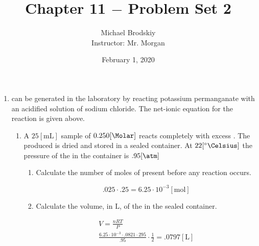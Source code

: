 \documentclass[12pt]{article}
\title{Chapter 11 $-$ Problem Set 2}
\date{February 1, 2020}
\author{Michael Brodskiy\\ \small Instructor: Mr. Morgan}
\begin{document}
\maketitle

\begin{center}
\end{center}

\begin{enumerate}

  \item {} can be generated in the laboratory by reacting potassium permanganate with an acidified solution of sodium chloride. The net-ionic equation for the reaction is given above.

    \begin{enumerate}

      \item A $25[\si{\milli\liter}]$ sample of $0.250[\si{\Molar}]$  reacts completely with excess . The  produced is dried and stored in a sealed container. At $22[\si{\degree\Celsius}]$ the pressure of the  in the container is $.95[\si{\atm}]$

        \begin{enumerate}

          \item Calculate the number of moles of  present before any reaction occurs.

            \begin{equation}
              .025\cdot.25=6.25\cdot10^{-3}[\si{\mole}]
              \label{1}
            \end{equation}

          \item Calculate the volume, in $\si{\liter}$, of the  in the sealed container.

            \begin{equation}
              \begin{split}
                V=\frac{nRT}{P}\\
                \frac{6.25\cdot10^{-3}\cdot .0821\cdot295}{.95}\cdot\frac{1}{2}=.0797[\si{\liter}]\\
              \end{split}
              \label{2}
            \end{equation}

        \end{enumerate}


\end{enumerate}
\end{enumerate}
\end{document}
